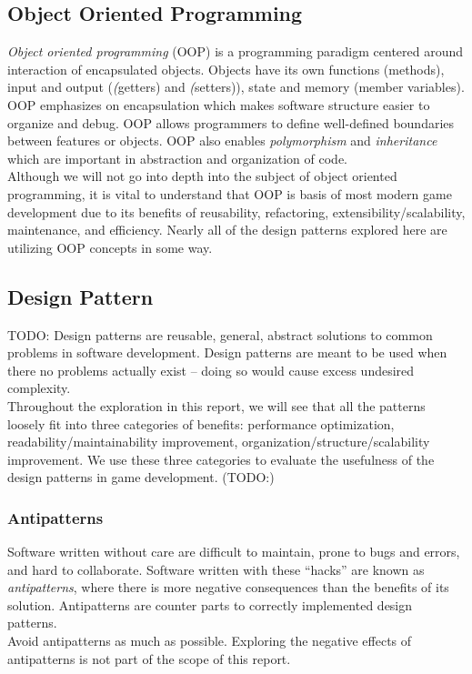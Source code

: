 \begin{multicols}{2}
\subsection{Object Oriented Programming}

\textit{Object oriented programming} (OOP) is a programming paradigm centered around interaction of encapsulated objects. Objects have its own functions (methods), input and output (\textit(getters) and \textit(setters)), state and memory (member variables). OOP emphasizes on encapsulation which makes software structure easier to organize and debug. OOP allows programmers to define well-defined boundaries between features or objects. OOP also enables \textit{polymorphism} and \textit{inheritance} which are important in abstraction and organization of code.\cite{oop}\bs
\\
Although we will not go into depth into the subject of object oriented programming, it is vital to understand that OOP is basis of most modern game development due to its benefits of reusability, refactoring, extensibility/scalability, maintenance, and efficiency\cite{oop}. Nearly all of the design patterns explored here are utilizing OOP concepts in some way. 

\subsection{Design Pattern}

TODO:
Design patterns are reusable, general, abstract solutions to common problems in software development.\cite{sm-designpatterns} Design patterns are meant to be used when there no problems actually exist -- doing so would cause excess undesired complexity.\cite{gof}\bs
\\
Throughout the exploration in this report, we will see that all the patterns loosely fit into three categories of benefits: performance optimization, readability/maintainability improvement, organization/structure/scalability improvement. We use these three categories to evaluate the usefulness of the design patterns in game development. (TODO:)

\subsubsection{Antipatterns}
Software written without care are difficult to maintain, prone to bugs and errors, and hard to collaborate. Software written with these ``hacks'' are known as \textit{antipatterns}, where there is more negative consequences than the benefits of its solution. Antipatterns are counter parts to correctly implemented design patterns.\cite{sm-antipatterns}\bs
\\
Avoid antipatterns as much as possible. Exploring the negative effects of antipatterns is not part of the scope of this report.


\end{multicols}
